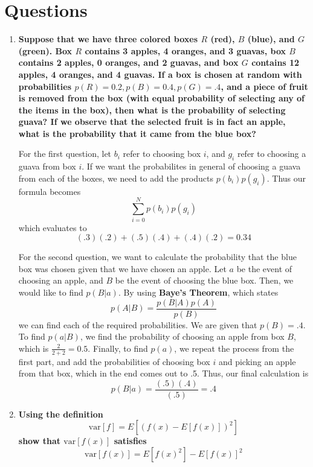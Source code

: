 \documentclass{article}
\begin{document}
\section{Questions}
\begin{enumerate}
	\item 
		\textbf{Suppose that we have three colored boxes $R$ (red), $B$ (blue),
				and $G$ (green). Box $R$ contains 3 apples, 4 oranges, and 3 guavas,
				box $B$ contains 2 apples, 0 oranges, and 2 guavas, and box $G$ contains
				12 apples, 4 oranges, and 4 guavas. If a box is chosen at random with 
				probabilities $p(R)=0.2,p(B)=0.4,p(G)=.4$, and a piece of fruit is removed
				from the box (with equal probability of selecting any of the items in the box),
				then what is the probability of selecting guava? If we observe that the selected
				fruit is in fact an apple, what is the probability that it came from the blue box?}

		For the first question, let $b_{i}$ refer to choosing box $i$, and $g_{i}$ refer 
		to choosing a guava from box $i$. If we want the probabilites in general of choosing
		a guava from each of the boxes, we need to add the products $p(b_{i})p(g_{i})$. Thus 
		our formula becomes 
				\[ \sum_{i=0}^{N}p(b_{i})p(g_{i})\]
		which evaluates to 
				\[(.3)(.2) + (.5)(.4) + (.4)(.2) = 0.34\]
		
		For the second question, we want to calculate the probability that the blue box was chosen
		given that we have chosen an apple. Let $a$ be the event of choosing an apple, and $B$ be
		the event of choosing the blue box. Then, we would like to find $p(B|a)$. By using
		\textbf{Baye's Theorem}, which states
		\[ p(A|B) = \frac{p(B|A)p(A)}{p(B)}\]
		we can find each of the required probabilities. We are given that $p(B) = .4$. To find
		$p(a|B)$, we find the probability of choosing an apple from box $B$, which is 
		$\frac{2}{2+2} = 0.5$. Finally, to find $p(a)$, we repeat the process from the first part,
		and add the probabilities of choosing box $i$ and picking an apple from that box, which in the
		end comes out to .5. Thus, our final calculation is 
				\[ p(B|a) = \frac{(.5)(.4)}{(.5)} = .4\]


		\item
		\textbf{Using the definition} \[\textrm{var}[f] = E[(f(x) - E[f(x)])^{2}] \]
		\textbf{show that $\textrm{var}[f(x)]$ satisfies}
		\[\textrm{var}[f(x)] = E[f(x)^{2}] - E[f(x)]^{2}\]

\end{enumerate}
\end{document}
